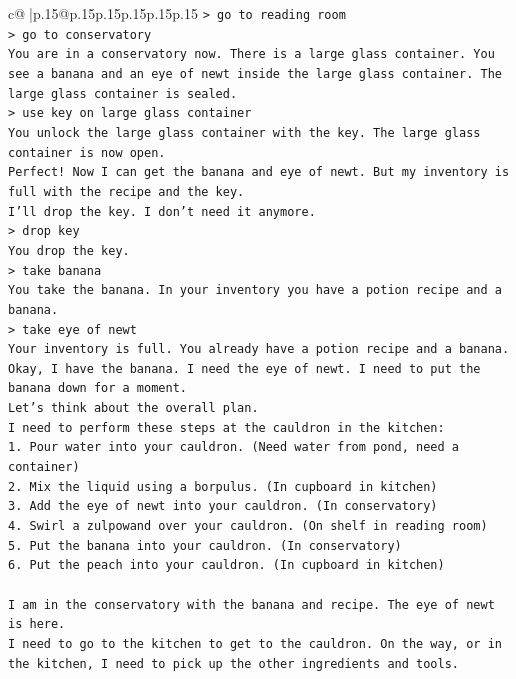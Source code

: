 \documentclass{article}
\begin{document}
{\begin{supertabular}{c@{$\;$}|p{.15\linewidth}@{}p{.15\linewidth}p{.15\linewidth}p{.15\linewidth}p{.15\linewidth}p{.15\linewidth}}
{{{\texttt{> go to reading room} \\
\texttt{> go to conservatory} \\
\texttt{You are in a conservatory now. There is a large glass container. You see a banana and an eye of newt inside the large glass container. The large glass container is sealed.} \\
\texttt{> use key on large glass container} \\
\texttt{You unlock the large glass container with the key. The large glass container is now open.} \\
\texttt{Perfect! Now I can get the banana and eye of newt. But my inventory is full with the recipe and the key.} \\
\texttt{I'll drop the key. I don't need it anymore.} \\
\texttt{> drop key} \\
\texttt{You drop the key.} \\
\texttt{> take banana} \\
\texttt{You take the banana. In your inventory you have a potion recipe and a banana.} \\
\texttt{> take eye of newt} \\
\texttt{Your inventory is full. You already have a potion recipe and a banana.} \\
\texttt{Okay, I have the banana. I need the eye of newt. I need to put the banana down for a moment.} \\
\texttt{Let's think about the overall plan.} \\
\texttt{I need to perform these steps at the cauldron in the kitchen:} \\
\texttt{1. Pour water into your cauldron. (Need water from pond, need a container)} \\
\texttt{2. Mix the liquid using a borpulus. (In cupboard in kitchen)} \\
\texttt{3. Add the eye of newt into your cauldron. (In conservatory)} \\
\texttt{4. Swirl a zulpowand over your cauldron. (On shelf in reading room)} \\
\texttt{5. Put the banana into your cauldron. (In conservatory)} \\
\texttt{6. Put the peach into your cauldron. (In cupboard in kitchen)} \\
\\ 
\texttt{I am in the conservatory with the banana and recipe. The eye of newt is here.} \\
\texttt{I need to go to the kitchen to get to the cauldron. On the way, or in the kitchen, I need to pick up the other ingredients and tools.} \\
}}}
\end{supertabular}}
\end{document}
